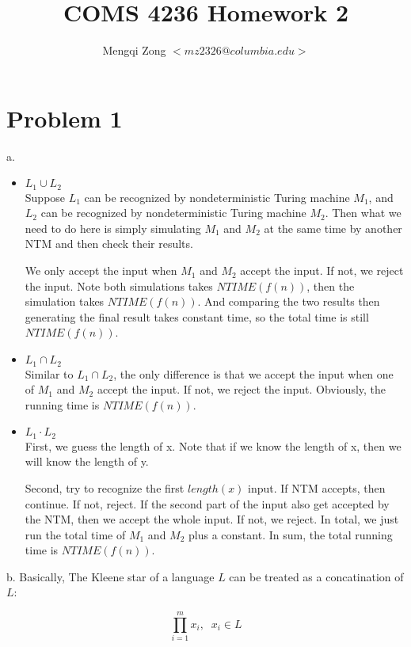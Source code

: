 \documentclass[12pt]{article}
\title{COMS 4236 Homework 2}
\author{Mengqi Zong $<mz2326@columbia.edu>$}
\begin{document}
\maketitle

\setlength{\parindent}{0in}

\section*{Problem 1}

a.
\begin{itemize}
\item $L_1 \cup L_2$ \\
  Suppose $L_1$ can be recognized by nondeterministic Turing machine
  $M_1$, and $L_2$ can be recognized by nondeterministic Turing
  machine $M_2$. Then what we need to do here is simply simulating
  $M_1$ and $M_2$ at the same time by another NTM and then check their
  results.

  We only accept the input when $M_1$ and $M_2$ accept the input. If
  not, we reject the input. Note both simulations takes
  $NTIME(f(n))$, then the simulation takes $NTIME(f(n))$. And
  comparing the two results then generating the final result takes
  constant time, so the total time is still $NTIME(f(n))$.
\item $L_1 \cap L_2$ \\
  Similar to $L_1 \cap L_2$, the only difference is that we accept the
  input when one of $M_1$ and $M_2$ accept the input. If not, we
  reject the input. Obviously, the running time is $NTIME(f(n))$.
\item $L_1 \cdot L_2$ \\
  First, we guess the length of x. Note that if we know the length of
  x, then we will know the length of y.

  Second, try to recognize the first $length(x)$ input. If NTM
  accepts, then continue. If not, reject. If the second part of the
  input also get accepted by the NTM, then we accept the whole
  input. If not, we reject. In total, we just run the total time of
  $M_1$ and $M_2$ plus a constant. In sum, the total running time is
  $NTIME(f(n))$.
\end{itemize}

b. Basically, The Kleene star of a language $L$ can be treated as a
concatination of $L$: 

\begin{equation*}
\prod_{i=1}^m {x_i}, \; \; x_i \in L 
\end{equation*}
\end{document}
